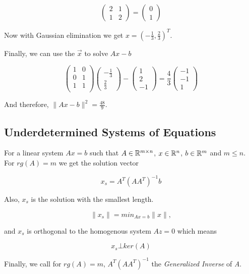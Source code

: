 \[
	\begin{pmatrix}
	2 & 1 \\
	1 & 2
	\end{pmatrix}
	= 
	\begin{pmatrix}
	0 \\
	1
	\end{pmatrix}
\]

Now with Gaussian elimination we get \(x = (-\frac{1}{3}, \frac{2}{3})^T\). 
\vspace{\baselineskip}

Finally, we can use the \(\vec{x}\) to solve \(Ax - b\)

\[
	\begin{pmatrix}
		1 & 0 \\
		0 & 1 \\
		1 & 1 \\
	\end{pmatrix}
	\begin{pmatrix}
		-\frac{1}{3} \\
		\frac{2}{3}
	\end{pmatrix}
	-
	\begin{pmatrix}
		1 \\
		2 \\
		-1
	\end{pmatrix}
	=
	\frac{4}{3}
	\begin{pmatrix}
	-1 \\
	-1 \\
	1
	\end{pmatrix}
\]

And therefore, \(\|Ax - b\|^2 = \frac{48}{9}\).

\subsection{Underdetermined Systems of Equations}

For a linear system \(Ax = b\) such that \(A \in \mathbb{R}^{m \times n}\), \(x\in \mathbb{R}^n\), 
\(b \in \mathbb{R}^m\) and \(m \le n\). For \(rg(A) = m\) we get the solution vector

\[
	x_s = A^T {(A A^T)}^{-1} b
\]

Also, \(x_s\) is the solution with the smallest length. 

\[
	\|x_s\| = min_{Ax = b} \|x\|,
\] 

and \(x_s\) is orthogonal to the homogenous system \(Az = 0\) which means

\[
	x_s \bot ker(A)
\]

Finally, we call for  \(rg(A) = m\), \(A^T {(A A^T)}^{-1}\) the \emph{Generalized Inverse} of \emph{A}.
\vspace{\baselineskip}

